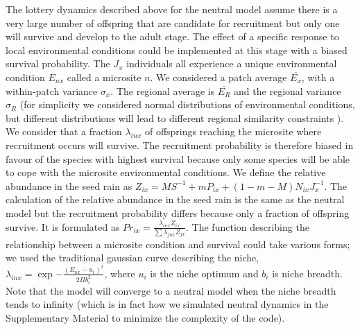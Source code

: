 \documentclass[12pt]{article}
\begin{document}
The lottery dynamics described above for the neutral model assume there is a
very large number of offspring that are candidate for recruitment but only one
will survive and develop to the adult stage. The effect of a specific response to
local environmental conditions could be implemented at this stage with a biased
survival probability. The $J_x$ individuals all experience a unique
environmental condition $E_{nx}$ called a microsite $n$. We considered a patch
average $\overline{E_x}$, with a within-patch variance $\sigma_x$. The regional
average is $\overline{E_R}$ and the regional variance $\sigma_R$ (for simplicity
we considered normal distributions of environmental conditions, but different
distributions will lead to different regional similarity constraints
\parencite{Mouquet2003,Tilman2004,Gravel2006}). We consider that a fraction
$\lambda_{inx}$ of offsprings reaching the microsite where recruitment occurs
will survive. The recruitment probability is therefore biased in favour of the
species with highest survival because only some species will be able to cope
with the microsite environmental conditions. We define the relative
abundance in the seed rain as $Z_{ix} = MS^{-1} + mP_{ix} +
(1-m-M)N_{ix}J_x^{-1}$. The calculation of the relative abundance in the seed
rain is the same as the neutral model but the recruitment probability differs
because only a fraction of offspring survive. It is formulated as $Pr_{ix} =
\frac{\lambda_{inx}Z_{ix}}{\sum \lambda_{jnx}Z_{jx}}$. The function describing
the relationship between a microsite condition and survival could take various
forms; we used the traditional gaussian curve describing the niche,
$\lambda_{inx} = \exp{-\frac{(E_{nx}-u_i)^2}{2\Pi b_i^2}}$, where $u_i$ is the
niche optimum and $b_i$ is niche breadth. Note that the model will converge to a
neutral model when the niche breadth tends to infinity (which is in fact how we
simulated neutral dynamics in the Supplementary Material to minimize the
complexity of the code).
\end{document}
